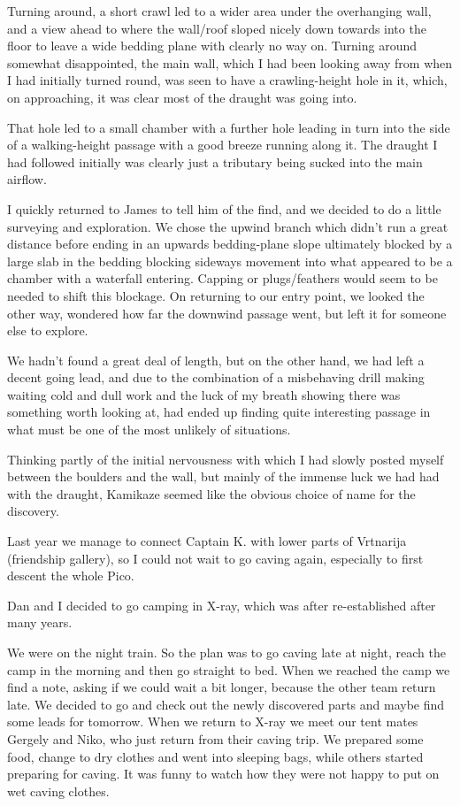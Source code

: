 Turning around, a short crawl led to a wider area under the overhanging
wall, and a view ahead to where the wall/roof sloped nicely down towards
into the floor to leave a wide bedding plane with clearly no way on.
Turning around somewhat disappointed, the main wall, which I had been
looking away from when I had initially turned round, was seen to have a
crawling-height hole in it, which, on approaching, it was clear most of
the draught was going into.

That hole led to a small chamber with a further hole leading in turn
into the side of a walking-height passage with a good breeze running
along it. The draught I had followed initially was clearly just a
tributary being sucked into the main airflow.

I quickly returned to James to tell him of the find, and we decided to
do a little surveying and exploration. We chose the upwind branch which
didn't run a great distance before ending in an upwards bedding-plane
slope ultimately blocked by a large slab in the bedding blocking
sideways movement into what appeared to be a chamber with a waterfall
entering. Capping or plugs/feathers would seem to be needed to shift
this blockage. On returning to our entry point, we looked the other way,
wondered how far the downwind passage went, but left it for someone else
to explore.

We hadn't found a great deal of length, but on the other hand, we had
left a decent going lead, and due to the combination of a misbehaving
drill making waiting cold and dull work and the luck of my breath
showing there was something worth looking at, had ended up finding quite
interesting passage in what must be one of the most unlikely of
situations.

Thinking partly of the initial nervousness with which I had slowly
posted myself between the boulders and the wall, but mainly of the
immense luck we had had with the draught, Kamikaze seemed like the
obvious choice of name for the discovery.


Last year we manage to connect Captain K. with lower parts of Vrtnarija
(friendship gallery), so I could not wait to go caving again, especially
to first descent the whole Pico.

Dan and I decided to go camping in X-ray, which was after re-established
after many years.

We were on the night train. So the plan was to go caving late at night,
reach the camp in the morning and then go straight to bed. When we
reached the camp we find a note, asking if we could wait a bit longer,
because the other team return late. We decided to go and check out the
newly discovered parts and maybe find some leads for tomorrow. When we
return to X-ray we meet our tent mates Gergely and Niko, who just return
from their caving trip. We prepared some food, change to dry clothes and
went into sleeping bags, while others started preparing for caving. It
was funny to watch how they were not happy to put on wet caving clothes.

